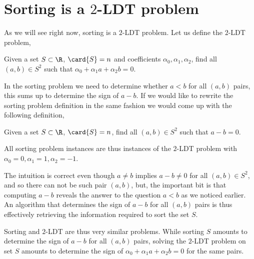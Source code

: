 \section{Sorting is a $2$-LDT problem}

As we will see right now, sorting is a $2$-LDT problem. Let us define the
$2$-LDT problem,

\begin{problem}
Given a set $S \subset \R$, $\card{S} = n$ and coefficients $\alpha_0,
\alpha_1, \alpha_2$, find all $(a,b) \in S^2$ such that
$\alpha_0 + \alpha_1 a + \alpha_2 b = 0$.
\end{problem}

In the sorting problem we need to determine whether $a < b$ for all $(a,b)$
pairs, this sums up to determine the sign of $a-b$. If we would like to rewrite
the sorting problem definition in the same fashion we would come up with the
following definition,

\begin{problem}
Given a set $S \subset \R$, $\card{S} = n$, find all $(a,b) \in S^2$ such that
$a - b = 0$.
\end{problem}

All sorting problem instances are thus instances of the $2$-LDT problem with
$\alpha_0 = 0, \alpha_1 = 1, \alpha_2 = -1$.

The intuition is correct even though $a \neq b$ implies $a-b \neq 0$ for all
$(a,b) \in S^2$, and so there can not be such pair $(a,b)$, but, the important
bit is that computing $a-b$ reveals the answer to the question $a<b$ as we
noticed earlier. An algorithm that determines the sign of $a-b$ for all $(a,b)$
pairs is thus effectively retrieving the information required to sort the set
$S$.

Sorting and $2$-LDT are thus very similar problems. While sorting $S$ amounts
to determine the sign of $a-b$ for all $(a,b)$ pairs, solving the $2$-LDT
problem on set $S$ amounts to determine the sign of $\alpha_0 + \alpha_1 a +
\alpha_2 b = 0$ for the same pairs.
